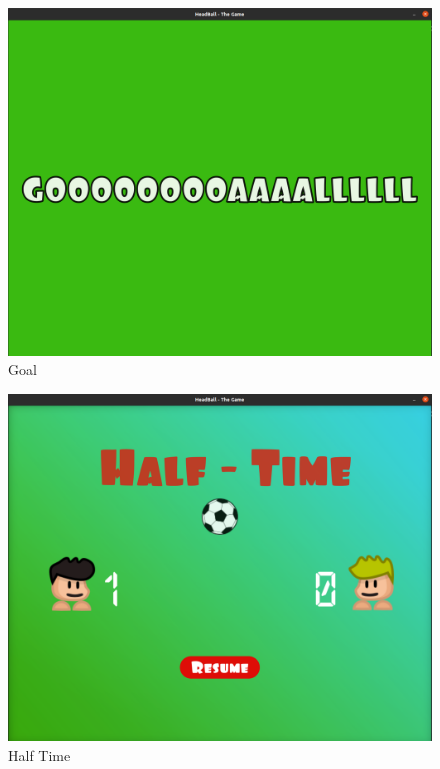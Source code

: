 \documentclass[main]{subfiles}
\begin{document}
\begin{figure}[H]
    \centering
    \includegraphics[scale=0.25]{graphics/state_screenshots/goal_state}
    \caption{Goal}
    \label{fig:goal_state}
\end{figure}

\begin{figure}[H]
    \centering
    \includegraphics[scale=0.25]{graphics/state_screenshots/half_state}
    \caption{Half Time}
    \label{fig:half_state}
\end{figure}
\end{document}
